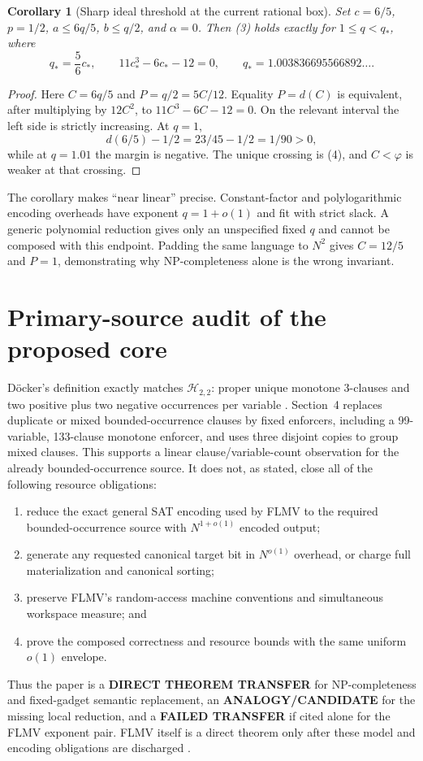 \documentclass[11pt]{article}
\newtheorem{corollary}[theorem]{Corollary}
\newcommand{\Htwo}{\mathcal H_{2,2}}
\begin{document}
\begin{corollary}[Sharp ideal threshold at the current rational box]
Set $c=6/5$, $p=1/2$, $a\le6q/5$, $b\le q/2$, and $\alpha=0$.  Then (3)
holds exactly for $1\le q<q_*$, where
\[
 q_*=\frac56c_*,\qquad 11c_*^3-6c_*-12=0,
 \qquad q_*=1.003836695566892\ldots .                  \tag{4}
\]
\end{corollary}
\begin{proof}
Here $C=6q/5$ and $P=q/2=5C/12$.  Equality $P=d(C)$ is equivalent, after
multiplying by $12C^2$, to $11C^3-6C-12=0$.  On the relevant interval the
left side is strictly increasing.  At $q=1$,
\[
 d(6/5)-1/2=23/45-1/2=1/90>0,
\]
while at $q=1.01$ the margin is negative.  The unique crossing is (4), and
$C<\varphi$ is weaker at that crossing.
\end{proof}

The corollary makes ``near linear'' precise.  Constant-factor and
polylogarithmic encoding overheads have exponent $q=1+o(1)$ and fit with
strict slack.  A generic polynomial reduction gives only an unspecified
fixed $q$ and cannot be composed with this endpoint.  Padding the same
language to $N^2$ gives $C=12/5$ and $P=1$, demonstrating why
NP-completeness alone is the wrong invariant.

\section{Primary-source audit of the proposed core}
D\"ocker's definition exactly matches $\Htwo$: proper unique monotone
3-clauses and two positive plus two negative occurrences per variable
\cite{doecker}.  Section~4 replaces duplicate or mixed bounded-occurrence
clauses by fixed enforcers, including a 99-variable, 133-clause monotone
enforcer, and uses three disjoint copies to group mixed clauses.  This
supports a linear clause/variable-count observation for the already
bounded-occurrence source.  It does not, as stated, close all of the following
resource obligations:
\begin{enumerate}[leftmargin=*]
\item reduce the exact general SAT encoding used by FLMV to the required
bounded-occurrence source with $N^{1+o(1)}$ encoded output;
\item generate any requested canonical target bit in $N^{o(1)}$ overhead, or
charge full materialization and canonical sorting;
\item preserve FLMV's random-access machine conventions and simultaneous
workspace measure; and
\item prove the composed correctness and resource bounds with the same
uniform $o(1)$ envelope.
\end{enumerate}
Thus the paper is a \textbf{DIRECT THEOREM TRANSFER} for NP-completeness and
fixed-gadget semantic replacement, an \textbf{ANALOGY/CANDIDATE} for the
missing local reduction, and a \textbf{FAILED TRANSFER} if cited alone for
the FLMV exponent pair.  FLMV itself is a direct theorem only after these
model and encoding obligations are discharged \cite{flmv}.
\end{document}
